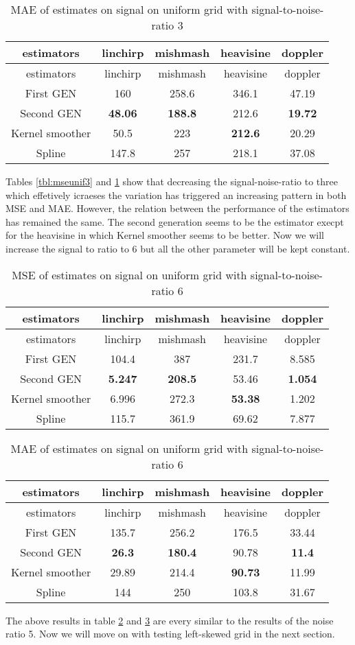 \documentclass[12pt,twoside, a4paper]{reedthesis}
\begin{document}
\begin{longtable}[]{@{}ccccc@{}}
\caption{\label{tbl:maeunif3}MAE of estimates on signal on uniform grid with signal-to-noise-ratio 3}\tabularnewline
\toprule
estimators & linchirp & mishmash & heavisine & doppler\tabularnewline
\midrule
\endfirsthead
\toprule
estimators & linchirp & mishmash & heavisine & doppler\tabularnewline
\midrule
\endhead
First GEN & 160 & 258.6 & 346.1 & 47.19\tabularnewline
Second GEN & \textbf{48.06} & \textbf{188.8} & 212.6 & \textbf{19.72}\tabularnewline
Kernel smoother & 50.5 & 223 & \textbf{212.6} & 20.29\tabularnewline
Spline & 147.8 & 257 & 218.1 & 37.08\tabularnewline
\bottomrule
\end{longtable}
Tables \ref{tbl:mseunif3} and \ref{tbl:maeunif3} show that decreasing the signal-noise-ratio to three which effetively icraeses the variation has triggered an increasing pattern in both MSE and MAE. However, the relation between the performance of the estimators has remained the same. The second generation seems to be the estimator execpt for the heavisine in which Kernel smoother seems to be better. Now we will increase the signal to ratio to 6 but all the other parameter will be kept constant.
\begin{longtable}[]{@{}ccccc@{}}
\caption{\label{tbl:mseunif6}MSE of estimates on signal on uniform grid with signal-to-noise-ratio 6}\tabularnewline
\toprule
estimators & linchirp & mishmash & heavisine & doppler\tabularnewline
\midrule
\endfirsthead
\toprule
estimators & linchirp & mishmash & heavisine & doppler\tabularnewline
\midrule
\endhead
First GEN & 104.4 & 387 & 231.7 & 8.585\tabularnewline
Second GEN & \textbf{5.247} & \textbf{208.5} & 53.46 & \textbf{1.054}\tabularnewline
Kernel smoother & 6.996 & 272.3 & \textbf{53.38} & 1.202\tabularnewline
Spline & 115.7 & 361.9 & 69.62 & 7.877\tabularnewline
\bottomrule
\end{longtable}
\begin{longtable}[]{@{}ccccc@{}}
\caption{\label{tbl:maeunif6}MAE of estimates on signal on uniform grid with signal-to-noise-ratio 6}\tabularnewline
\toprule
estimators & linchirp & mishmash & heavisine & doppler\tabularnewline
\midrule
\endfirsthead
\toprule
estimators & linchirp & mishmash & heavisine & doppler\tabularnewline
\midrule
\endhead
First GEN & 135.7 & 256.2 & 176.5 & 33.44\tabularnewline
Second GEN & \textbf{26.3} & \textbf{180.4} & 90.78 & \textbf{11.4}\tabularnewline
Kernel smoother & 29.89 & 214.4 & \textbf{90.73} & 11.99\tabularnewline
Spline & 144 & 250 & 103.8 & 31.67\tabularnewline
\bottomrule
\end{longtable}
The above results in table \ref{tbl:mseunif6} and \ref{tbl:maeunif6} are every similar to the results of the noise ratio 5. Now we will move on with testing left-skewed grid in the next section.
\end{document}
